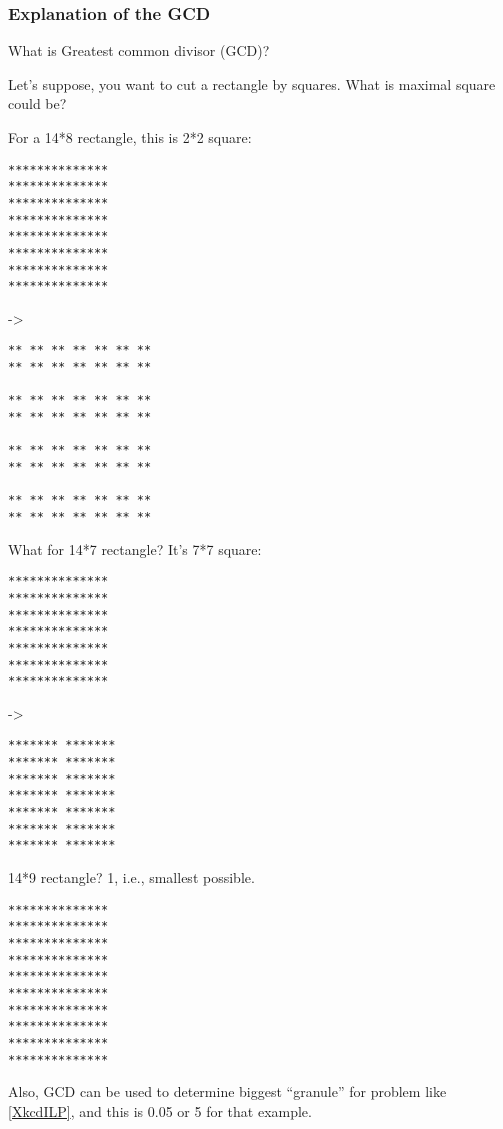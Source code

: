 \subsubsection{Explanation of the \ac{GCD}}

What is Greatest common divisor (\ac{GCD})?

Let's suppose, you want to cut a rectangle by squares. What is maximal square could be?

For a 14*8 rectangle, this is 2*2 square:

\begin{lstlisting}
**************
**************
**************
**************
**************
**************
**************
**************
\end{lstlisting}

->

\begin{lstlisting}
** ** ** ** ** ** **
** ** ** ** ** ** **
                  
** ** ** ** ** ** **
** ** ** ** ** ** **
                  
** ** ** ** ** ** **
** ** ** ** ** ** **
                  
** ** ** ** ** ** **
** ** ** ** ** ** **
\end{lstlisting}

What for 14*7 rectangle? It's 7*7 square:

\begin{lstlisting}
**************
**************
**************
**************
**************
**************
**************
\end{lstlisting}

->

\begin{lstlisting}
******* *******
******* *******
******* *******
******* *******
******* *******
******* *******
******* *******
\end{lstlisting}

14*9 rectangle? 1, i.e., smallest possible.

\begin{lstlisting}
**************
**************
**************
**************
**************
**************
**************
**************
**************
**************
\end{lstlisting}

Also, GCD can be used to determine biggest ``granule'' for problem like \ref{XkcdILP}, and this is 0.05 or 5 for that example.

